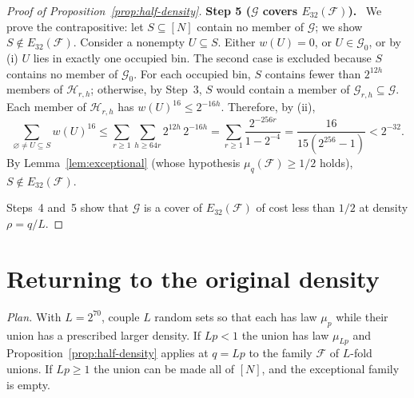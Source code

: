 \documentclass[11pt,letterpaper]{article}
\theoremstyle{definition}
\theoremstyle{remark}
\numberwithin{equation}{section}
\newcommand{\step}[1]{\par\medskip\noindent\textbf{#1}\ }
\begin{document}
\begin{proof}[Proof of Proposition~\ref{prop:half-density}]
\step{Step 5 ($\mathcal G$ covers $E_{32}(\mathcal F)$).}
We prove the contrapositive: let $S\subseteq[N]$ contain no member of
$\mathcal G$; we show $S\notin E_{32}(\mathcal F)$. Consider a nonempty
$U\subseteq S$. Either $w(U)=0$, or $U\in\mathcal G_0$, or by (i) $U$ lies
in exactly one occupied bin. The second case is excluded because $S$
contains no member of $\mathcal G_0$. For each occupied bin, $S$ contains
fewer than $2^{12h}$ members of $\mathcal H_{r,h}$; otherwise, by Step~3,
$S$ would contain a member of $\mathcal G_{r,h}\subseteq\mathcal G$. Each
member of $\mathcal H_{r,h}$ has $w(U)^{16}\le2^{-16h}$. Therefore, by
(ii),
\begin{equation}\label{eq:bin-power-sum}
 \sum_{\varnothing\ne U\subseteq S}w(U)^{16}
 \le\sum_{r\ge1}\sum_{h\ge64r}2^{12h}\,2^{-16h}
 =\sum_{r\ge1}\frac{2^{-256r}}{1-2^{-4}}
 =\frac{16}{15(2^{256}-1)}<2^{-32}.
\end{equation}
By Lemma~\ref{lem:exceptional} (whose hypothesis
$\mu_q(\mathcal F)\ge1/2$ holds), $S\notin E_{32}(\mathcal F)$.

Steps~4 and~5 show that $\mathcal G$ is a cover of $E_{32}(\mathcal F)$ of
cost less than $1/2$ at density $\rho=q/L$.
\end{proof}

\section{Returning to the original density}
\label{sec:density}

\emph{Plan.} With $L=2^{70}$, couple $L$ random sets so that each has law
$\mu_p$ while their union has a prescribed larger density. If $Lp<1$ the
union has law $\mu_{Lp}$ and Proposition~\ref{prop:half-density} applies at
$q=Lp$ to the family $\mathcal F$ of $L$-fold unions. If $Lp\ge1$ the
union can be made all of $[N]$, and the exceptional family is empty.
\end{document}
